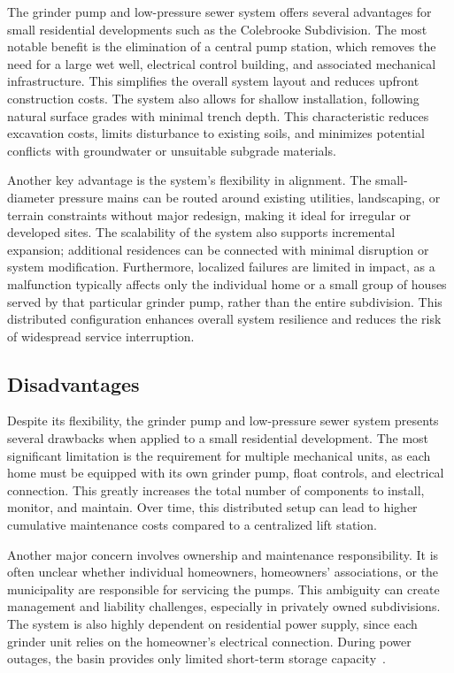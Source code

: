 The grinder pump and low-pressure sewer system offers several advantages for small residential developments such as the Colebrooke Subdivision. The most notable benefit is the elimination of a central pump station, which removes the need for a large wet well, electrical control building, and associated mechanical infrastructure. This simplifies the overall system layout and reduces upfront construction costs. The system also allows for shallow installation, following natural surface grades with minimal trench depth. This characteristic reduces excavation costs, limits disturbance to existing soils, and minimizes potential conflicts with groundwater or unsuitable subgrade materials.

Another key advantage is the system’s flexibility in alignment. The small-diameter pressure mains can be routed around existing utilities, landscaping, or terrain constraints without major redesign, making it ideal for irregular or developed sites. The scalability of the system also supports incremental expansion; additional residences can be connected with minimal disruption or system modification. Furthermore, localized failures are limited in impact, as a malfunction typically affects only the individual home or a small group of houses served by that particular grinder pump, rather than the entire subdivision. This distributed configuration enhances overall system resilience and reduces the risk of widespread service interruption.

\subsection{Disadvantages}

Despite its flexibility, the grinder pump and low-pressure sewer system presents several drawbacks when applied to a small residential development. The most significant limitation is the requirement for multiple mechanical units, as each home must be equipped with its own grinder pump, float controls, and electrical connection. This greatly increases the total number of components to install, monitor, and maintain. Over time, this distributed setup can lead to higher cumulative maintenance costs compared to a centralized lift station.

Another major concern involves ownership and maintenance responsibility. It is often unclear whether individual homeowners, homeowners’ associations, or the municipality are responsible for servicing the pumps. This ambiguity can create management and liability challenges, especially in privately owned subdivisions. The system is also highly dependent on residential power supply, since each grinder unit relies on the homeowner’s electrical connection. During power outages, the basin provides only limited short-term storage capacity~\cite{NFPA_70_2023}.

